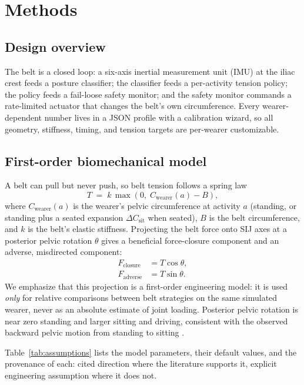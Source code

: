 \documentclass[11pt]{article}
\begin{document}
\section{Methods}
\subsection{Design overview}
The belt is a closed loop: a six-axis inertial measurement unit (IMU)
at the iliac crest feeds a posture classifier; the classifier feeds a
per-activity tension policy; the policy feeds a fail-loose safety
monitor; and the safety monitor commands a rate-limited actuator that
changes the belt's own circumference. Every wearer-dependent number
lives in a JSON profile with a calibration wizard, so all geometry,
stiffness, timing, and tension targets are per-wearer customizable.

\subsection{First-order biomechanical model}
A belt can pull but never push, so belt tension follows a spring law
\begin{equation}
T \;=\; k \,\max\!\left(0,\; C_{\text{wearer}}(a) - B\right),
\end{equation}
where $C_{\text{wearer}}(a)$ is the wearer's pelvic circumference at
activity $a$ (standing, or standing plus a seated expansion
$\Delta C_{\text{sit}}$ when seated), $B$ is the belt circumference, and
$k$ is the belt's elastic stiffness. Projecting the belt force onto SIJ
axes at a posterior pelvic rotation $\theta$ gives a beneficial
force-closure component and an adverse, misdirected component:
\begin{align}
F_{\text{closure}} &= T\cos\theta,\\
F_{\text{adverse}} &= T\sin\theta .
\end{align}
We emphasize that this projection is a first-order engineering model:
it is used \emph{only} for relative comparisons between belt strategies
on the same simulated wearer, never as an absolute estimate of joint
loading. Posterior pelvic rotation is near zero standing and larger
sitting and driving, consistent with the observed backward pelvic
motion from standing to sitting \cite{ref24}.

Table~\ref{tab:assumptions} lists the model parameters, their default
values, and the provenance of each: cited direction where the
literature supports it, explicit engineering assumption where it does
not.
\end{document}
